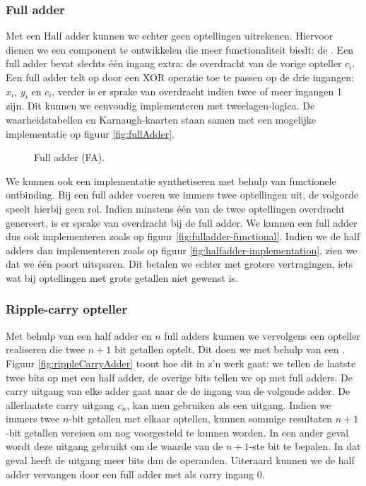 \subsubsection{Full adder}
\label{sss:fulladder}
Met een Half adder kunnen we echter geen optellingen uitrekenen. Hiervoor dienen we een component te ontwikkelen die meer functionaliteit biedt: de . Een full adder bevat slechts \'e\'en ingang extra: de overdracht van de vorige opteller $c_i$. Een full adder telt op door een XOR operatie toe te passen op de drie ingangen: $x_i$, $y_i$ en $c_i$, verder is er sprake van overdracht indien twee of meer ingangen 1 zijn. Dit kunnen we eenvoudig implementeren met tweelagen-logica. De waarheidstabellen en Karnaugh-kaarten staan samen met een mogelijke implementatie op figuur \ref{fig:fullAdder}.
\begin{figure}[hbt]
\centering
{}
\caption{Full adder (FA).}
\end{figure}
We kunnen ook een implementatie synthetiseren met behulp van functionele ontbinding. Bij een full adder voeren we immers twee optellingen uit, de volgorde speelt hierbij geen rol. Indien minstens \'e\'en van de twee optellingen overdracht genereert, is er sprake van overdracht bij de full adder. We kunnen een full adder dus ook implementeren zoals op figuur \ref{fig:fulladder-functional}. Indien we de half adders dan implementeren zoals op figuur \ref{fig:halfadder-implementation}, zien we dat we \'e\'en poort uitsparen. Dit betalen we echter met grotere vertragingen, iets wat bij optellingen met grote getallen niet gewenst is.
\subsubsection{Ripple-carry opteller}
Met behulp van een half adder en $n$ full adders kunnen we vervolgens een opteller realiseren die twee $n+1$ bit getallen optelt. Dit doen we met behulp van een . Figuur \ref{fig:rippleCarryAdder}%
toont hoe dit in z'n werk gaat: we tellen de laatste twee bits op met een half adder, de overige bits tellen we op met full adders. De carry uitgang van elke adder gaat naar de de ingang van de volgende adder. De allerlaatste carry uitgang $c_n$, kan men gebruiken als een  uitgang. Indien we immers twee $n$-bit getallen met elkaar optellen, kunnen sommige resultaten $n+1$-bit getallen vereisen om nog voorgesteld te kunnen worden. In een ander geval wordt deze uitgang gebruikt om de waarde van de $n+1$-ste bit te bepalen. In dat geval heeft de uitgang meer bits dan de operanden. Uiteraard kunnen we de half adder vervangen door een full adder met als carry ingang 0.
